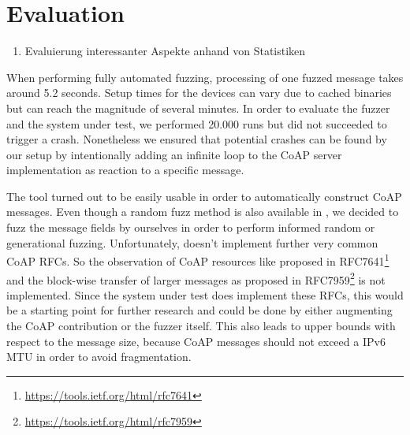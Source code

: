 \section{Evaluation}
\label{section:evaluation}

\begin{enumerate}
	\item Evaluierung interessanter Aspekte anhand von Statistiken
\end{enumerate}

When performing fully automated fuzzing, processing of one fuzzed message takes around 5.2 seconds. Setup times for the devices can vary due to cached binaries but can reach the magnitude of several minutes. In order to evaluate the fuzzer and the system under test, we performed 20.000 runs but did not succeeded to trigger a crash. Nonetheless we ensured that potential crashes can be found by our setup by intentionally adding an infinite loop to the CoAP server implementation as reaction to a specific message.  

The \scapy tool turned out to be easily usable in order to automatically construct CoAP messages. Even though a random fuzz method is also available in \scapy, we decided to fuzz the message fields by ourselves in order to perform informed random or generational fuzzing. Unfortunately, \scapy doesn't implement further very common CoAP RFCs. So the observation of CoAP resources like proposed in RFC7641\footnote{\url{https://tools.ietf.org/html/rfc7641}} and the block-wise transfer of larger messages as proposed in RFC7959\footnote{\url{https://tools.ietf.org/html/rfc7959}} is not implemented. Since the system under test does implement these RFCs, this would be a starting point for further research and could be done by either augmenting the \scapy CoAP contribution or the fuzzer itself. This also leads to upper bounds with respect to the message size, because CoAP messages should not exceed a IPv6 MTU in order to avoid fragmentation. 


